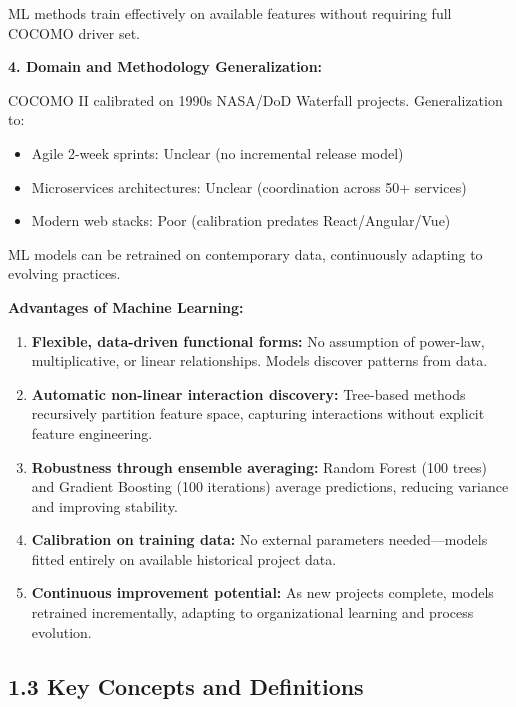\documentclass[11pt,a4paper]{article}
\begin{document}
ML methods train effectively on available features without requiring full COCOMO driver set.

\textbf{4. Domain and Methodology Generalization:}

COCOMO II calibrated on 1990s NASA/DoD Waterfall projects. Generalization to:
\begin{itemize}
    \item Agile 2-week sprints: Unclear (no incremental release model)
    \item Microservices architectures: Unclear (coordination across 50+ services)
    \item Modern web stacks: Poor (calibration predates React/Angular/Vue)
\end{itemize}

ML models can be retrained on contemporary data, continuously adapting to evolving practices.

\textbf{Advantages of Machine Learning:}

\begin{enumerate}
    \item \textbf{Flexible, data-driven functional forms:} No assumption of power-law, multiplicative, or linear relationships. Models discover patterns from data.
    
    \item \textbf{Automatic non-linear interaction discovery:} Tree-based methods recursively partition feature space, capturing interactions without explicit feature engineering.
    
    \item \textbf{Robustness through ensemble averaging:} Random Forest (100 trees) and Gradient Boosting (100 iterations) average predictions, reducing variance and improving stability.
    
    \item \textbf{Calibration on training data:} No external parameters needed---models fitted entirely on available historical project data.
    
    \item \textbf{Continuous improvement potential:} As new projects complete, models retrained incrementally, adapting to organizational learning and process evolution.
\end{enumerate}

\subsection{1.3 Key Concepts and Definitions}
\end{document}
